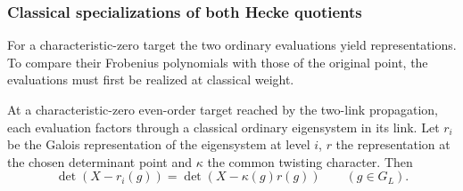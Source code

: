 \subsubsection{Classical specializations of both Hecke quotients}
\label{par:count-two-classical}
\hypertarget{source-ordinary-count-ii-point-output}{}

For a characteristic-zero target the two ordinary evaluations yield representations. To compare their Frobenius polynomials with those of the original point, the evaluations must first be realized at classical weight.

\begin{proposition}\label{prop:two-link-classical-control}
At a characteristic-zero even-order target reached by the
two-link propagation, each evaluation factors through a classical
ordinary eigensystem in its link. Let \(r_i\) be the Galois representation of the eigensystem at level \(i\), \(r\) the representation at the chosen determinant point and \(\kappa\) the common twisting character. Then 
\[
 \det(X-r_i(g))=\det(X-\kappa(g)r(g))\qquad(g\in G_L).
\]

\end{proposition}

